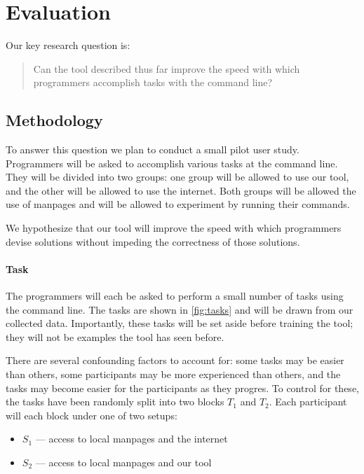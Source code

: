 \section{Evaluation}

Our key research question is:
%
\begin{quote}
    Can the tool described thus far improve the speed with which programmers
    accomplish tasks with the command line?
\end{quote}

\subsection{Methodology}
\label{subsec:methodology}

To answer this question we plan to conduct a small pilot user study. Programmers
will be asked to accomplish various tasks at the command line. They will be
divided into two groups: one group will be allowed to use our tool, and the
other will be allowed to use the internet. Both groups will be allowed the use
of manpages and will be allowed to experiment by running their commands.

We hypothesize that our tool will improve the speed with which programmers
devise solutions without impeding the correctness of those solutions.

\paragraph{Task} The programmers will each be asked to perform a small number of
tasks using the command line. The tasks are shown in \autoref{fig:tasks} and
will be drawn from our collected data. Importantly, these tasks will be set
aside before training the tool; they will not be examples the tool has seen
before.

There are several confounding factors to account for: some tasks may be easier
than others, some participants may be more experienced than others, and the
tasks may become easier for the participants as they progres. To control for
these, the tasks have been randomly split into two blocks $T_1$ and $T_2$.
Each participant will each block under one of two setups:
\begin{itemize}
    \item $S_1$ --- access to local manpages and the internet
    \item $S_2$ --- access to local manpages and our tool
\end{itemize}

